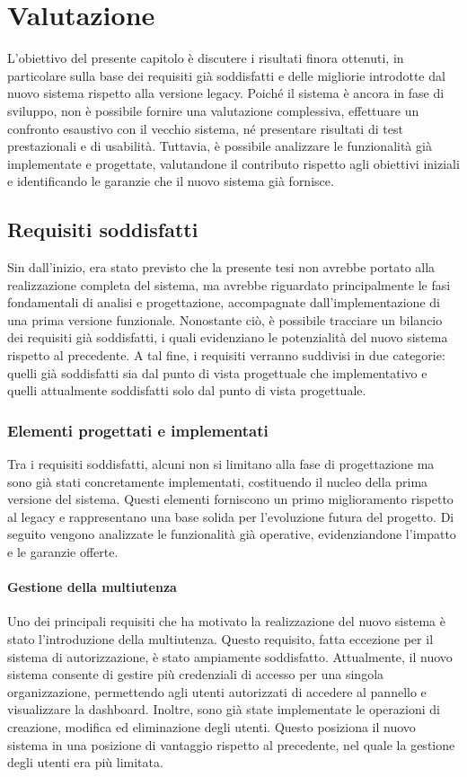 \chapter{Valutazione}

L'obiettivo del presente capitolo è discutere i risultati finora ottenuti, in particolare sulla base dei requisiti già soddisfatti e delle migliorie introdotte dal nuovo sistema rispetto alla versione legacy. Poiché il sistema è ancora in fase di sviluppo, non è possibile fornire una valutazione complessiva, effettuare un confronto esaustivo con il vecchio sistema, né presentare risultati di test prestazionali e di usabilità. Tuttavia, è possibile analizzare le funzionalità già implementate e progettate, valutandone il contributo rispetto agli obiettivi iniziali e identificando le garanzie che il nuovo sistema già fornisce.

\section{Requisiti soddisfatti}
Sin dall'inizio, era stato previsto che la presente tesi non avrebbe portato alla realizzazione completa del sistema, ma avrebbe riguardato principalmente le fasi fondamentali di analisi e progettazione, accompagnate dall'implementazione di una prima versione funzionale. Nonostante ciò, è possibile tracciare un bilancio dei requisiti già soddisfatti, i quali evidenziano le potenzialità del nuovo sistema rispetto al precedente. A tal fine, i requisiti verranno suddivisi in due categorie: quelli già soddisfatti sia dal punto di vista progettuale che implementativo e quelli attualmente soddisfatti solo dal punto di vista progettuale.

\subsection{Elementi progettati e implementati}
Tra i requisiti soddisfatti, alcuni non si limitano alla fase di progettazione ma sono già stati concretamente implementati, costituendo il nucleo della prima versione del sistema. Questi elementi forniscono un primo miglioramento rispetto al legacy e rappresentano una base solida per l’evoluzione futura del progetto. Di seguito vengono analizzate le funzionalità già operative, evidenziandone l'impatto e le garanzie offerte.

\subsubsection{Gestione della multiutenza}
Uno dei principali requisiti che ha motivato la realizzazione del nuovo sistema è stato l’introduzione della multiutenza. Questo requisito, fatta eccezione per il sistema di autorizzazione, è stato ampiamente soddisfatto. Attualmente, il nuovo sistema consente di gestire più credenziali di accesso per una singola organizzazione, permettendo agli utenti autorizzati di accedere al pannello e visualizzare la dashboard. Inoltre, sono già state implementate le operazioni di creazione, modifica ed eliminazione degli utenti. Questo posiziona il nuovo sistema in una posizione di vantaggio rispetto al precedente, nel quale la gestione degli utenti era più limitata.

